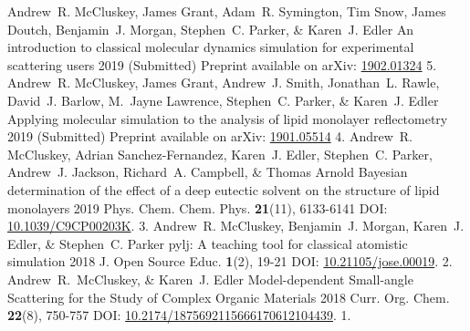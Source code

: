 \begin{cvpubys}
  \cvpuby
    {Andrew~R. McCluskey, James Grant, Adam~R. Symington, Tim Snow, James Doutch, Benjamin~J. Morgan, Stephen~C. Parker, \& Karen~J. Edler}
    {An introduction to classical molecular dynamics simulation for experimental scattering users}
    {2019}
    {(Submitted)}
    {Preprint available on arXiv: \href{https://arxiv.org/abs/1902.01324}{1902.01324}}
    {}
    {5.}
  \cvpuby
    {Andrew~R. McCluskey, James Grant, Andrew~J. Smith, Jonathan~L. Rawle, David~J. Barlow, M.~Jayne Lawrence, Stephen~C. Parker, \& Karen~J. Edler}
    {Applying molecular simulation to the analysis of lipid monolayer
    reflectometry}
    {2019}
    {(Submitted)}
    {Preprint available on arXiv: \href{https://arxiv.org/abs/1901.05514}{1901.05514}}
    {}
    {4.}
  \cvpuby
    {Andrew~R. McCluskey, Adrian Sanchez-Fernandez, Karen~J. Edler, Stephen~C. Parker, Andrew~J. Jackson, Richard~A. Campbell, \& Thomas Arnold}
    {Bayesian determination of the effect of a deep eutectic solvent on the structure of lipid monolayers}
    {2019}
    {Phys. Chem. Chem. Phys.}
    {\textbf{21}(11), 6133-6141}
    {DOI: \href{https://doi.org/10.1039/C9CP00203K}{10.1039/C9CP00203K}.}
    {3.}
  \cvpuby
    {Andrew~R. McCluskey, Benjamin~J. Morgan, Karen~J. Edler, \& Stephen~C. Parker}
    {pylj: A teaching tool for classical atomistic simulation}
    {2018}
    {J. Open Source Educ.}
    {\textbf{1}(2), 19-21}
    {DOI: \href{http://doi.org/10.21105/jose.00019}{10.21105/jose.00019}.}
    {2.}
  \cvpuby
    {Andrew~R.~McCluskey, \& Karen~J. Edler}
    {Model-dependent Small-angle Scattering for the Study of Complex Organic Materials}
    {2018}
    {Curr. Org. Chem.}
    {\textbf{22}(8), 750-757}
    {DOI: \href{http://doi.org/10.2174/1875692115666170612104439}{10.2174/1875692115666170612104439}.}
    {1.}
\end{cvpubys}
